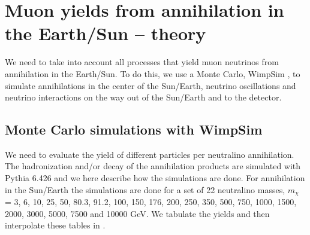 \section{Muon yields from annihilation in the Earth/Sun -- theory}


We need to take into account all processes that yield muon neutrinos from
annihilation in the Earth/Sun. To do this, we use a Monte Carlo, WimpSim \cite{Edsjo:2007ws}, to simulate
annihilations in the center of the Sun/Earth, neutrino oscillations and neutrino interactions on the way out of the Sun/Earth and to the detector.

\subsection{Monte Carlo simulations with WimpSim}
\label{sec:nt-mcsim}

We need to
evaluate the yield of different particles per neutralino annihilation.
The hadronization and/or decay of the annihilation products are
simulated with {\sc Pythia} \cite{Sjostrand:2006za} 6.426
and we here describe how the simulations are done.
For annihilation in the Sun/Earth 
the simulations are done for a set of 22 neutralino
masses, $m_{\chi}$ = 3, 6, 10, 25, 50, 80.3, 91.2, 100, 150, 176, 200, 250,
350, 500, 750, 1000, 1500, 2000, 3000, 5000, 7500 and 10000 GeV\@.
We tabulate the yields and then interpolate these tables in \ds.

